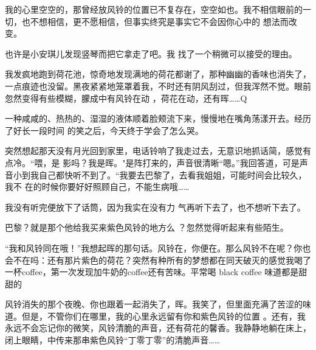 \documentclass{article}
\begin{document}
我的心里空空的，那曾经放风铃的位置已不复存在，空空如也。我不相信眼前的一切，也不想相信，更不愿相信，但事实终究是事实它不会因你心中的
想法而改变。 

也许是小安琪儿发现竖琴而把它拿走了吧。我
找了一个稍微可以接受的理由。 

我发疯地跑到荷花池，惊奇地发现满地的荷花都谢了，那种幽幽的香味也消失了，一点痕迹也没留。黑夜紧紧地笼罩着我，不时还有阴风刮过，但我浑然不觉。眼前忽然变得有些模糊，朦成中有风铃在动
，荷花在动，还有晖……Q 

一种咸咸的、热热的、湿湿的液体顺着脸颊流下来，慢慢地在嘴角荡漾开去。经历了好长一段时间
的笑之后，今天终于学会了怎么哭。 

突然想起那天没有月光回到家里，电话铃响了我走过去，无意识地抓话简，感觉有点冷。“喂，是
\newpage
影吗？我是晖。"是阵打来的，声音很清晰“嗯。”我回答道，可是声音小到我自己都快听不到了。“我要去巴黎了，去看我姐姐，可能时间会比较久，我不
在的时候你要好好照顾自己，不能生病哦…… 

我没有听完便放下了话筒，因为我实在没有力
气再听下去了，也不想听下去了。 

巴黎？就是那个他给我买来紫色风铃的地方么
？忽然觉得听起来有些陌生。 

“我和风铃同在哦！”我想起晖的那句话。风铃在，你便在。那么风铃不在呢？你也会不在吗：还有那片紫色的荷花？突然有种所有的梦想都在同天破灭的感觉我喝了一杯coffee，第一次发现加牛奶的coffee还有苦味。平常喝 black 
coffee 味道都是甜甜的 

风铃消失的那个夜晚、你也跟着一起消失了，晖。我笑了，但里面充满了苦涩的味道。但是，不管你们在哪里，我的心里永远留有你和紫色风铃的位置
\newpage
。还有，我永远不会忘记你的微笑，风铃清脆的声音，还有荷花的馨香。我静静地躺在床上，闭上眼睛，中传来那串紫色风铃“丁零丁零”的清脆声音……
\end{document}
